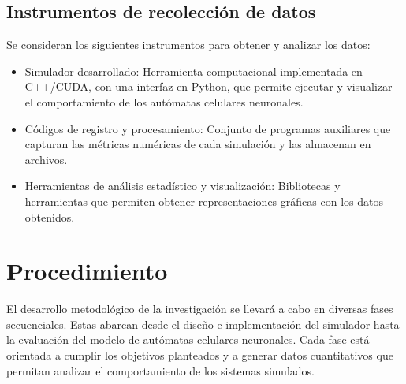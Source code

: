 \subsection{Instrumentos de recolección de datos}

Se consideran los siguientes instrumentos para obtener y analizar los datos:

\begin{itemize}
	
	\item Simulador desarrollado: Herramienta computacional implementada en C++/CUDA, con una interfaz en Python, que permite ejecutar y visualizar el comportamiento de los autómatas celulares neuronales.
	
	\item Códigos de registro y procesamiento: Conjunto de programas auxiliares que capturan las métricas numéricas de cada simulación y las almacenan en archivos.
	
	\item Herramientas de análisis estadístico y visualización: Bibliotecas y herramientas que permiten obtener representaciones gráficas con los datos obtenidos. 
	
\end{itemize}

\section{Procedimiento}

El desarrollo metodológico de la investigación se llevará a cabo en diversas fases secuenciales. Estas abarcan desde el diseño e implementación del simulador hasta la evaluación del modelo de autómatas celulares neuronales. Cada fase está orientada a cumplir los objetivos planteados y a generar datos cuantitativos que permitan analizar el comportamiento de los sistemas simulados.

